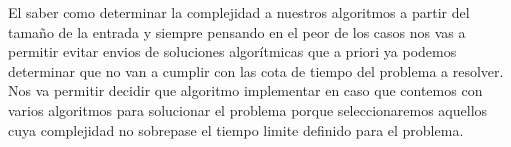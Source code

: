 El saber como determinar la complejidad a nuestros algoritmos a partir del tamaño de la entrada y siempre pensando en el peor de los casos nos vas a permitir evitar envios de soluciones algorítmicas que a priori ya podemos determinar que no van a cumplir con las cota de tiempo del problema a resolver. Nos va permitir decidir que algoritmo implementar en caso que contemos con varios algoritmos para solucionar el problema porque seleccionaremos aquellos cuya complejidad no sobrepase el tiempo limite definido para el problema.